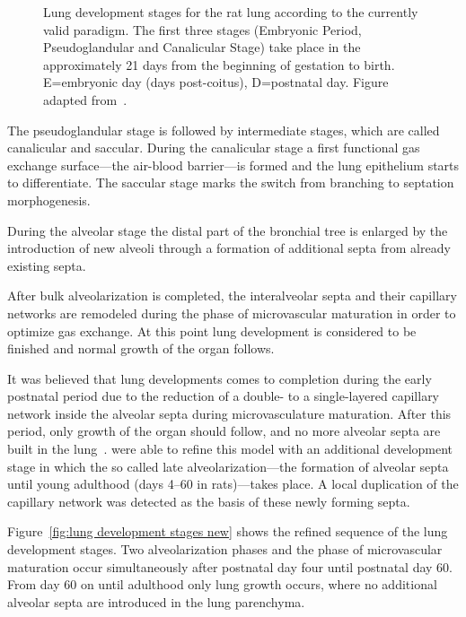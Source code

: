 \begin{figure}
	\noindent\makebox[\textwidth]{%
		\centering%
		}%
	\caption[Lung development stages]{Lung development stages for the rat lung according to the currently valid paradigm. The first three stages (Embryonic Period, Pseudoglandular and Canalicular Stage) take place in the approximately 21 days from the beginning of gestation to birth. E=embryonic day (days post-coitus), D=postnatal day. Figure adapted from~\cite{Schittny2007a}.}
	\label{fig:lung development stages old}
\end{figure}

The pseudoglandular stage is followed by intermediate stages, which are called canalicular and saccular. During the canalicular stage a first functional gas exchange surface---the air-blood barrier---is formed and the lung epithelium starts to differentiate. The saccular stage marks the switch from branching to septation morphogenesis.

During the alveolar stage the distal part of the bronchial tree is enlarged by the introduction of new alveoli through a formation of additional septa from already existing septa. 

After bulk alveolarization is completed, the interalveolar septa and their capillary networks are remodeled during the phase of microvascular maturation in order to optimize gas exchange. At this point lung development is considered to be finished and normal growth of the organ follows.

It was believed that lung developments comes to completion during the early postnatal period due to the reduction of a double- to a single-layered capillary network inside the alveolar septa during microvasculature maturation. After this period, only growth of the organ should follow, and no more alveolar septa are built in the lung~\cite{Burri1999,Schittny2004}. \citet{Schittny2008} were able to refine this model with an additional development stage in which the so called late alveolarization---the formation of alveolar septa until young adulthood (days 4--60 in rats)---takes place. A local duplication of the capillary network was detected as the basis of these newly forming septa.

Figure~\ref{fig:lung development stages new} shows the refined sequence of the lung development stages. Two alveolarization phases and the phase of microvascular maturation occur simultaneously after postnatal day four until postnatal day 60. From day 60 on until adulthood only lung growth occurs, where no additional alveolar septa are introduced in the lung parenchyma.

